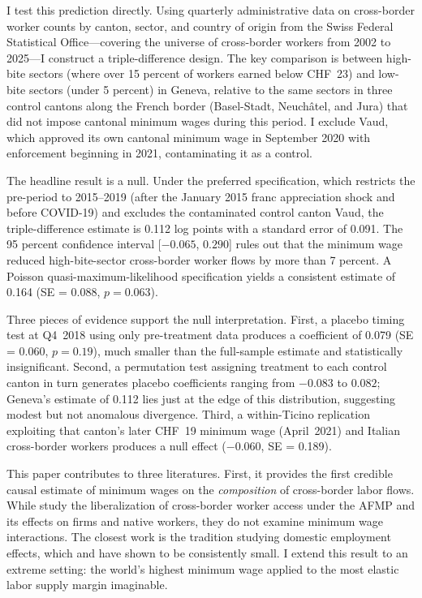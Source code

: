 \documentclass[12pt]{article}
\begin{document}
I test this prediction directly. Using quarterly administrative data on cross-border worker counts by canton, sector, and country of origin from the Swiss Federal Statistical Office---covering the universe of cross-border workers from 2002 to 2025---I construct a triple-difference design. The key comparison is between high-bite sectors (where over 15 percent of workers earned below CHF~23) and low-bite sectors (under 5 percent) in Geneva, relative to the same sectors in three control cantons along the French border (Basel-Stadt, Neuch\^atel, and Jura) that did not impose cantonal minimum wages during this period. I exclude Vaud, which approved its own cantonal minimum wage in September 2020 with enforcement beginning in 2021, contaminating it as a control.

The headline result is a null. Under the preferred specification, which restricts the pre-period to 2015--2019 (after the January 2015 franc appreciation shock and before COVID-19) and excludes the contaminated control canton Vaud, the triple-difference estimate is 0.112 log points with a standard error of 0.091. The 95 percent confidence interval [$-0.065$, $0.290$] rules out that the minimum wage reduced high-bite-sector cross-border worker flows by more than 7 percent. A Poisson quasi-maximum-likelihood specification yields a consistent estimate of 0.164 (SE = 0.088, $p = 0.063$).

Three pieces of evidence support the null interpretation. First, a placebo timing test at Q4~2018 using only pre-treatment data produces a coefficient of 0.079 (SE = 0.060, $p = 0.19$), much smaller than the full-sample estimate and statistically insignificant. Second, a permutation test assigning treatment to each control canton in turn generates placebo coefficients ranging from $-0.083$ to $0.082$; Geneva's estimate of 0.112 lies just at the edge of this distribution, suggesting modest but not anomalous divergence. Third, a within-Ticino replication exploiting that canton's later CHF~19 minimum wage (April~2021) and Italian cross-border workers produces a null effect ($-0.060$, SE = 0.189).

This paper contributes to three literatures. First, it provides the first credible causal estimate of minimum wages on the \textit{composition} of cross-border labor flows. While \citet{beerli2021} study the liberalization of cross-border worker access under the AFMP and its effects on firms and native workers, they do not examine minimum wage interactions. The closest work is the \citet{card1994} tradition studying domestic employment effects, which \citet{dube2019} and \citet{cengiz2019} have shown to be consistently small. I extend this result to an extreme setting: the world's highest minimum wage applied to the most elastic labor supply margin imaginable.
\end{document}
